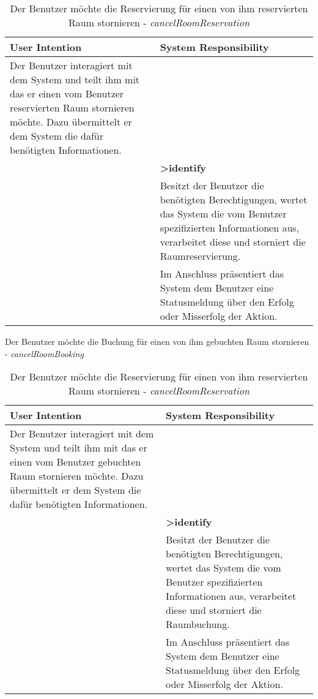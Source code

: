 \begin{table}[h]
	\caption{Der Benutzer möchte die Reservierung für einen von ihm reservierten Raum stornieren - \textit{cancelRoomReservation}}
	\begin{tabularx}{\textwidth}{|X|X|}
	\rowcolor{heading} \textbf{User Intention} & \textbf{System Responsibility}\\ \hline
	Der Benutzer interagiert mit dem System und teilt ihm mit das er einen vom Benutzer reservierten Raum stornieren möchte. Dazu übermittelt er dem System die dafür benötigten Informationen. & \\  \hline
	 & \textbf{>identify} \\ \hline
	 & Besitzt der Benutzer die benötigten Berechtigungen, wertet das System die vom Benutzer spezifizierten Informationen aus, verarbeitet diese und storniert die Raumreservierung.\\ \hline
	 & Im Anschluss präsentiert das System dem Benutzer eine Statusmeldung über den Erfolg oder Misserfolg der Aktion.\\ \hline
	\end{tabularx}
	
	Der Benutzer möchte die Buchung für einen von ihm gebuchten Raum stornieren - \textit{cancelRoomBooking}\\
	\begin{tabularx}{\textwidth}{|X|X|}
	\rowcolor{heading} \textbf{User Intention} & \textbf{System Responsibility}\\ \hline
	Der Benutzer interagiert mit dem System und teilt ihm mit das er einen vom Benutzer gebuchten Raum stornieren möchte. Dazu übermittelt er dem System die dafür benötigten Informationen. & \\  \hline
	 & \textbf{>identify} \\ \hline
	 & Besitzt der Benutzer die benötigten Berechtigungen, wertet das System die vom Benutzer spezifizierten Informationen aus, verarbeitet diese und storniert die Raumbuchung.\\ \hline
	 & Im Anschluss präsentiert das System dem Benutzer eine Statusmeldung über den Erfolg oder Misserfolg der Aktion.\\ \hline
	\end{tabularx}
	

\end{table}
